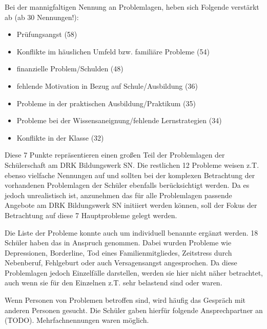 Bei der mannigfaltigen Nennung an Problemlagen, heben sich Folgende verstärkt ab (ab 30 Nennungen!): 

\begin{itemize}
	\item Prüfungsangst (58)
	\item Konflikte im häuslichen Umfeld bzw. familiäre Probleme (54)
	\item finanzielle Problem/Schulden (48)
	\item fehlende Motivation in Bezug auf Schule/Ausbildung (36)
	\item Probleme in der praktischen Ausbildung/Praktikum (35)
	\item Probleme bei der Wissensaneignung/fehlende Lernstrategien (34)
	\item Konflikte in der Klasse (32)
\end{itemize}

Diese 7 Punkte repräsentieren einen großen Teil der Problemlagen der Schülerschaft am DRK Bildungswerk SN. Die restlichen 12 Probleme weisen z.T. ebenso vielfache Nennungen auf und sollten bei der komplexen Betrachtung der vorhandenen Problemlagen der Schüler ebenfalls berücksichtigt werden. Da es jedoch unrealistisch ist, anzunehmen das für alle Problemlagen passende Angebote am DRK Bildungswerk SN initiiert werden können, soll der Fokus der Betrachtung auf diese 7 Hauptprobleme gelegt werden.

Die Liste der Probleme konnte auch um individuell benannte ergänzt werden. 18 Schüler haben das in Anspruch genommen. Dabei wurden Probleme wie Depressionen, Borderline, Tod eines Familienmitgliedes, Zeitstress durch Nebenberuf, Fehlgeburt oder auch Versagensangst angesprochen. Da diese Problemlagen jedoch Einzelfälle darstellen, werden sie hier nicht näher betrachtet, auch wenn sie für den Einzelnen z.T. sehr belastend sind oder waren.

Wenn Personen von Problemen betroffen sind, wird häufig das Gespräch mit anderen Personen gesucht. Die Schüler gaben hierfür folgende Ansprechpartner an (TODO). Mehrfachnennungen waren möglich. 

